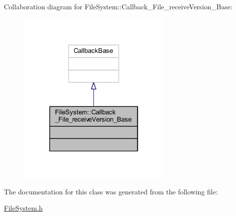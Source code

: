 Collaboration diagram for File\+System\+:\+:Callback\+\_\+\+File\+\_\+receive\+Version\+\_\+\+Base\+:
\nopagebreak
\begin{figure}[H]
\begin{center}
\leavevmode
\includegraphics[width=214pt]{class_file_system_1_1_callback___file__receive_version___base__coll__graph}
\end{center}
\end{figure}


The documentation for this class was generated from the following file\+:\begin{DoxyCompactItemize}
\item 
\hyperlink{_file_system_8h}{File\+System.\+h}\end{DoxyCompactItemize}
